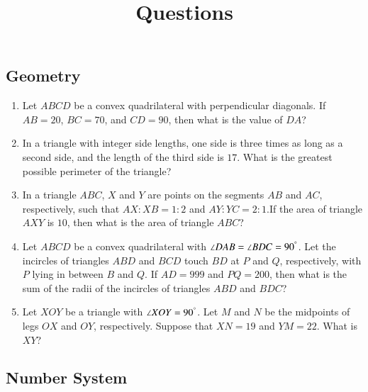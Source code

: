 \documentclass[12pt,letter paper]{article}
\title{Questions}
\date{}
\author{}
\begin{document}
\maketitle{}
\begin{center}
	\section*{Geometry}
\end{center}
\begin{enumerate}
    \item Let $ABCD$ be a convex quadrilateral with perpendicular diagonals. If $AB = 20$, $BC = 70$, and $CD = 90$, then what is the value of $DA$?
    \item In a triangle with integer side lengths, one side is three times as long as a second side, and the length of the third side is $17$. What is the greatest possible perimeter of the triangle?
    \item In a triangle $ABC$, $X$ and $Y$ are points on the segments $AB$ and $AC$, respectively, such that $ AX : XB = 1 : 2 $ and $ AY : YC = 2 : 1.$If the area of triangle $AXY$ is $10$, then what is the area of triangle $ABC$?
    \item Let $ABCD$ be a convex quadrilateral with $\angle DAB = \angle BDC = 90^\degree$. Let the incircles of triangles $ABD$ and $BCD$ touch $BD$ at $P$ and $Q$, respectively, with $P$ lying in between $B$ and $Q$. If $AD = 999$ and $PQ = 200$, then what is the sum of the radii of the incircles of triangles $ABD$ and $BDC$?
    \item Let $XOY$ be a triangle with $\angle XOY = 90^\degree$. Let $M$ and $N$ be the midpoints of legs $OX$ and $OY$, respectively. Suppose that $XN = 19$ and $YM = 22$. What is $XY$?
\end{enumerate}
\begin{center}
	\section*{Number System}
\end{center}
\end{document}
